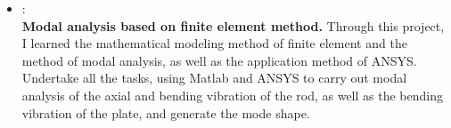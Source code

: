 \documentclass{resume}
\begin{document}
\begin{itemize}
	\item 
	: %
	\\
	\textbf{Modal analysis based on finite element method. } Through this project, I learned the mathematical modeling method of finite element and the method of modal analysis, as well as the application method of ANSYS.
	Undertake all the tasks, using Matlab and ANSYS to carry out modal analysis of the axial and bending vibration of the rod, as well as the bending vibration of the plate, and generate the mode shape.






\end{itemize}
\end{document}
